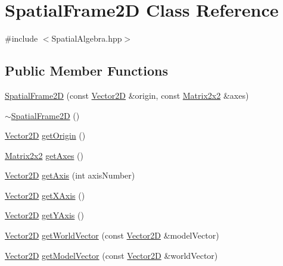\hypertarget{class_spatial_frame2_d}{\section{Spatial\-Frame2\-D Class Reference}
\label{class_spatial_frame2_d}
}


{\ttfamily \#include $<$Spatial\-Algebra.\-hpp$>$}

\subsection*{Public Member Functions}
\begin{DoxyCompactItemize}
\item 
\hyperlink{class_spatial_frame2_d_aa4d2de4a4d08853336151bca39d76afd}{Spatial\-Frame2\-D} (const \hyperlink{class_vector2_d}{Vector2\-D} \&origin, const \hyperlink{class_matrix2x2}{Matrix2x2} \&axes)
\item 
\hyperlink{class_spatial_frame2_d_aff52d6b4ae57a5f9fc570d18cec5c979}{$\sim$\-Spatial\-Frame2\-D} ()
\item 
\hyperlink{class_vector2_d}{Vector2\-D} \hyperlink{class_spatial_frame2_d_a1841753018bd746c8f8b9d0e35eef511}{get\-Origin} ()
\item 
\hyperlink{class_matrix2x2}{Matrix2x2} \hyperlink{class_spatial_frame2_d_ab1c4fa78d79a0b8f917faa6faddaa977}{get\-Axes} ()
\item 
\hyperlink{class_vector2_d}{Vector2\-D} \hyperlink{class_spatial_frame2_d_a22137da8514481ac30d6a222884ea0f3}{get\-Axis} (int axis\-Number)
\item 
\hyperlink{class_vector2_d}{Vector2\-D} \hyperlink{class_spatial_frame2_d_a319a55dbfa2435eaa1e931a640ec21be}{get\-X\-Axis} ()
\item 
\hyperlink{class_vector2_d}{Vector2\-D} \hyperlink{class_spatial_frame2_d_a1cba425a9e741e1d1e29557b189981cb}{get\-Y\-Axis} ()
\item 
\hyperlink{class_vector2_d}{Vector2\-D} \hyperlink{class_spatial_frame2_d_a69e849b6c8dfa61429aaeb27416777cc}{get\-World\-Vector} (const \hyperlink{class_vector2_d}{Vector2\-D} \&model\-Vector)
\item 
\hyperlink{class_vector2_d}{Vector2\-D} \hyperlink{class_spatial_frame2_d_ab5953b647c9357e7f5b906ea859ca9c7}{get\-Model\-Vector} (const \hyperlink{class_vector2_d}{Vector2\-D} \&world\-Vector)
\end{DoxyCompactItemize}


